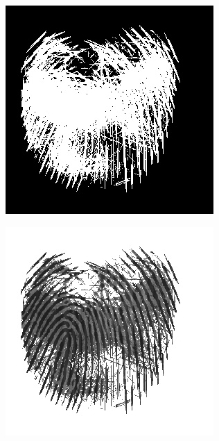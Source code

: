 \documentclass{beamer}
\begin{document}
{\begin{figure}[!ht]
\begin{subfigure}[ht]{0.15\textwidth}
        \end{subfigure}
        \qquad
        \begin{subfigure}[ht]{0.15\textwidth}
            \includegraphics[width=\textwidth]{fingerprints/2002Db3a/1_3_mask.jpg}
        \end{subfigure}
        \qquad
        \begin{subfigure}[ht]{0.15\textwidth}
            \includegraphics[width=\textwidth]{fingerprints/2002Db3a/1_3_filtered.jpg}
        \end{subfigure}
    \end{figure}
}
\end{document}
